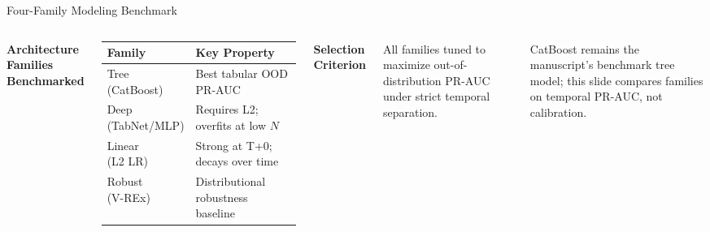 \documentclass[10pt, aspectratio=169]{beamer}
\begin{document}
\begin{frame}{Four-Family Modeling Benchmark}
    \begin{columns}
        \textbf{Architecture Families Benchmarked}

        \vspace{0.5em}
        \footnotesize
        \begin{tabular}{p{1.9cm} p{4.1cm}}
            \toprule
            \textbf{Family} & \textbf{Key Property} \\
            \midrule
            \shortstack[l]{Tree\\(CatBoost)} & Best tabular OOD PR-AUC \\[0.4em]
            \shortstack[l]{Deep\\(TabNet/MLP)} & Requires L2; overfits at low $N$ \\[0.4em]
            \shortstack[l]{Linear\\(L2 LR)} & Strong at T+0; decays over time \\[0.4em]
            \shortstack[l]{Robust\\(V-REx)} & Distributional robustness baseline \\
            \bottomrule
        \end{tabular}

        \textbf{Selection Criterion}
        \vspace{0.5em}

        All families tuned to maximize out-of-distribution PR-AUC under strict temporal separation.

        \vspace{0.8em}
        CatBoost remains the manuscript's benchmark tree model; this slide compares families on temporal PR-AUC, not calibration.
    \end{columns}
\end{frame}
\end{document}
